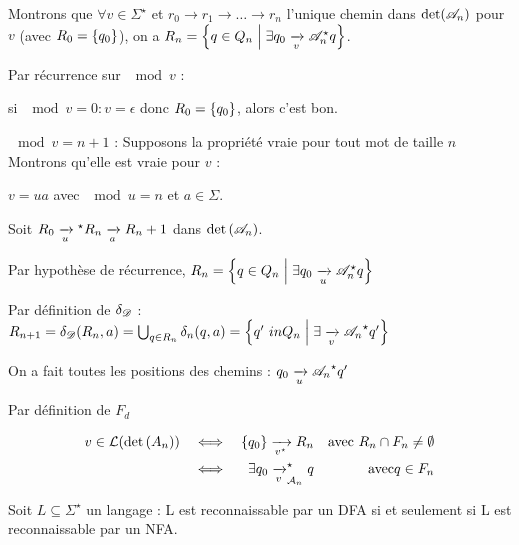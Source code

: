     \begin{nproof}
        Montrons que $\forall v \in \Sigma^\star$ et $r_0 \to r_1 \to \dots \to r_n$ l'unique chemin dans $\det \p{\bsA_n}$ pour $v$ (avec $R_0 = \left\{q_0\right\}$), on a $R_n = \ens{q \in Q_n \enstq \exists q_0 \lima{v}{\bsA_n^\star} q}$.
        
        Par récurrence sur $\mod{v}$ :
        \begin{enumerate}
            \itt si $\mod{v} = 0 : v = \epsilon$ donc $R_0 = \left\{q_0\right\}$, alors c'est bon.
            
            \itt $\mod{v} = n + 1$ : Supposons la propriété vraie pour tout mot de taille $n$ Montrons qu'elle est vraie pour $v$ :
            
            $v = ua$ avec $\mod{u} = n$ et $a \in \Sigma$.
            
            Soit $R_0 \lima{u} {}^\star R_n \lima{a}{} R_n+1$ dans $ \det{\bsA_n}$.
            
            Par hypothèse de récurrence, $R_n = \ens{q \in Q_n \enstq \exists q_0 \lima{u}{\bsA_n^\star} q}$
            
            Par définition de $\delta_{\mathscr{D}}$ :
            $R_{n+1} = \delta_\bsD \p{R_n, a} = \bigcup_{q \in R_n} \delta_n \p{q, a} = \ens{q' \ in Q_n \enstq \exists \lima{v}{\bsA_n}^\star q'}$
            
            \itt On a fait toutes les positions des chemins : $q_0 \lima{u}{\bsA_n}^\star q'$
        
        
        
            Par définition de $F_d$
            
            \begin{align*}
                v \in \bcL\p{\det{A_n}} &&\iff&& \ens{q_0} \lima{v^\star} R_n &&\text{avec} \ R_n \cap F_n \neq \emptyset\\
                &&\iff&& \exists q_0 \lima{v}^\star_{\bcA_n} q &&\text{avec} q \in F_n
            \end{align*}
            
        \end{enumerate}
    \end{nproof}
    
    \begin{corollary}{}{}
        Soit $L \subseteq \Sigma^\star$ un langage : L est reconnaissable par un DFA si et seulement si L est reconnaissable par un NFA.
    \end{corollary}
    
